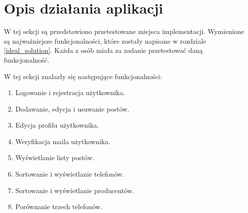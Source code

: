 \section{Opis działania aplikacji}
W tej sekcji są przedstawiono przetestowane miejsca implementacji. Wymienione są najważniejsze funkcjonalności, które zostały napisane w rozdziale \ref{ideal_solution}. Każda z osób miała za zadanie przetestować daną funkcjonalność.

W tej sekcji znalazły się następujące funkcjonalności:
\begin{enumerate}
  \item Logowanie i rejestracja użytkownika.
  \item Dodawanie, edycja i usuwanie postów.
  \item Edycja profilu użytkownika.
  \item Weryfikacja maila użytkownika.
  \item Wyświetlanie listy postów.
  \item Sortowanie i wyświetlanie telefonów.
  \item Sortowanie i wyświetlanie producentów.
  \item Porównanie trzech telefonów.
\end{enumerate}

